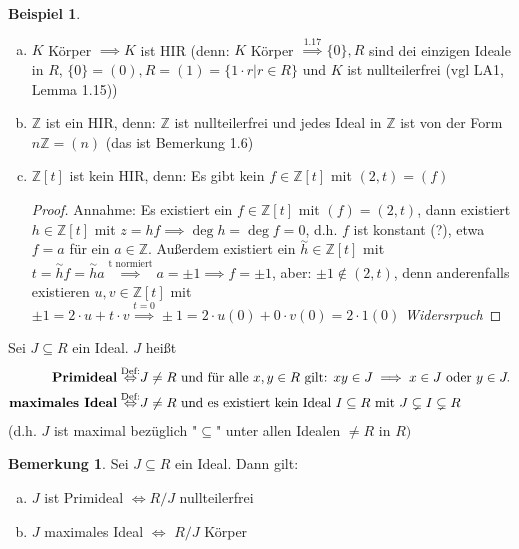 \documentclass[a4paper, titlepage]{article}
\theoremstyle{definition}
\newtheorem{bsp}[satz]{Beispiel}
\newtheorem{bem}[satz]{Bemerkung}
\newcommand{\Z}{\mathbb{Z}}
\begin{document}
\begin{bsp}
	\begin{enumerate}[(a)]
		\item $K$ Körper $\implies K$ ist HIR (denn: $K$ Körper $\overset{1.17}{\implies}\{0\}, R$ sind dei einzigen Ideale in $R$, $\{0\}=(0),R=(1)=\{1\cdot r|r\in R\}$ und $K$ ist nullteilerfrei (vgl LA1, Lemma 1.15))
		\item $\Z$ ist ein HIR, denn: $\Z$ ist nullteilerfrei und jedes Ideal in $\Z$ ist von der Form $n\Z=(n)$ (das ist Bemerkung 1.6)
		\item $\Z[t]$ ist kein HIR, denn: Es gibt kein $f\in \Z[t]$ mit $(2,t)=(f)$
		\begin{proof}
			Annahme: Es existiert ein $f\in \Z[t]$ mit $(f)=(2,t)$, dann existiert $h\in\Z[t]$ mit $z=hf\implies \operatorname{deg}h=\operatorname{deg}f=0$, d.h. $f$ ist konstant (?), etwa $f=a$ für ein $a\in \Z$. Außerdem existiert ein $\overset{\sim}{h}\in \Z[t]$ mit $t=\overset{\sim}{h}f=\overset{\sim}{h}a\overset{\text{t normiert}}{\implies}a=±1\implies f=±1$, aber: $±1\notin (2,t)$, denn anderenfalls existieren $u,v\in \Z[t]$ mit $±1=2\cdot u+t\cdot v\overset{t=0}{\implies }±1=2\cdot u(0)+0\cdot v(0)=	2\cdot 1(0)$ \textit{Widersrpuch}
		\end{proof}
	\end{enumerate}
	\end{bsp}
	\begin{definition}
		Sei $J\subseteq R$ ein Ideal.
		$J$ heißt 
		\begin{align*}
		\text{\textbf{Primideal}} \overset{\text{Def:}}{\Leftrightarrow}&J \neq R \text{ und für alle } x,y\in R \text{ gilt: } xy\in J\implies x\in J \text{ oder } y\in J.\\
		\text{\textbf{maximales Ideal}}\overset{\text{Def:}}{\Leftrightarrow}& J\neq R \text{ und es existiert kein Ideal } I\subseteq R\text{ mit }J\subsetneq I \subsetneq R\\
		\end{align*}
		(d.h. $J$ ist maximal bezüglich "$\subseteq$" unter allen Idealen $\neq R$ in $R)$
	\end{definition}
	\begin{bem}
		Sei $J\subseteq R$ ein Ideal. Dann gilt:
		\begin{enumerate}[(a)]
			\item $J$ ist Primideal $\Leftrightarrow R/J$ nullteilerfrei
			\item $J$ maximales Ideal $\Leftrightarrow$ $R/J$ Körper 
		\end{enumerate}
	\end{bem}
\end{document}

